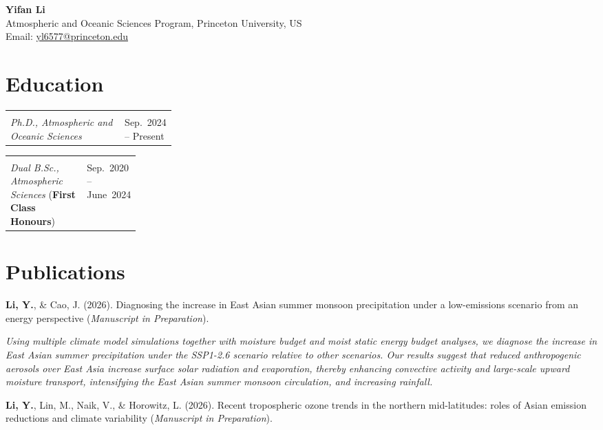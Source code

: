 \documentclass[11pt,a4paper]{article}
\makeatletter
\newcommand{\datedentry}[3][0.28]{%
  \noindent
  \begin{tabularx}{\linewidth}{@{}>{\raggedright\arraybackslash}X >{\raggedleft\arraybackslash}p{#1\linewidth}@{}}
    #2 & #3
  \end{tabularx}\par
}
\newcommand{\publication}[1]{%
  \Needspace{4\baselineskip}
  \par\noindent #1\par
}
\newcommand{\researchsummary}[1]{%
  {\itshape #1\par}\vspace{4pt}
}
\makeatother
\begin{document}
\begin{center}
  {\LARGE\bfseries Yifan Li}\\[4pt]
  Atmospheric and Oceanic Sciences Program, Princeton University, US\\[2pt]
  Email: \href{mailto:yl6577@princeton.edu}{yl6577@princeton.edu}
\end{center}

\section*{Education}

\datedentry{\begin{minipage}[t]{\linewidth}
  \textbf{Princeton University}\\
  \textit{Ph.D., Atmospheric and Oceanic Sciences}
\end{minipage}}{Sep.~2024 -- Present}

\datedentry[0.22]{\begin{minipage}[t]{\linewidth}
  {\fontsize{10.5}{12.5}\selectfont\textbf{\mbox{University of Reading \& Nanjing University of Information Science and Technology}}}\\
  \textit{Dual B.Sc., Atmospheric Sciences} (\textbf{First Class Honours})
\end{minipage}}{Sep.~2020 -- June~2024}

\section*{Publications}

\publication{\textbf{Li, Y.}, \& Cao, J. (2026). Diagnosing the increase in East Asian summer monsoon precipitation under a low-emissions scenario from an energy perspective (\textit{Manuscript in Preparation}).}

\researchsummary{Using multiple climate model simulations together with moisture budget and moist static energy budget analyses, we diagnose the increase in East Asian summer precipitation under the SSP1-2.6 scenario relative to other scenarios. Our results suggest that reduced anthropogenic aerosols over East Asia increase surface solar radiation and evaporation, thereby enhancing convective activity and large-scale upward moisture transport, intensifying the East Asian summer monsoon circulation, and increasing rainfall.}

\publication{\textbf{Li, Y.}, Lin, M., Naik, V., \& Horowitz, L. (2026). Recent tropospheric ozone trends in the northern mid-latitudes: roles of Asian emission reductions and climate variability (\textit{Manuscript in Preparation}).}
\end{document}
